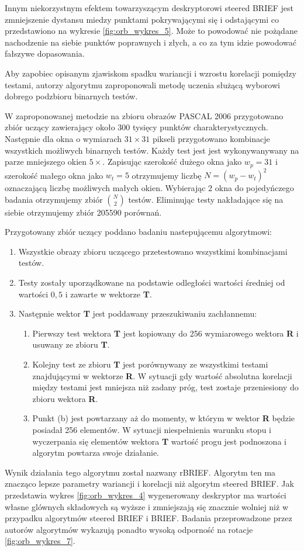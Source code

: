 Innym niekorzystnym efektem towarzyszącym deskryptorowi steered BRIEF jest zmniejszenie dystansu miedzy punktami pokrywającymi się i odstającymi co przedstawiono na wykresie \ref{fig:orb_wykres_5}. Może to powodować nie pożądane nachodzenie na siebie punktów poprawnych i złych, a co za tym idzie powodować fałszywe dopasowania.

Aby zapobiec opisanym zjawiskom spadku wariancji i wzrostu korelacji pomiędzy testami, autorzy algorytmu zaproponowali metodę uczenia służącą wyborowi dobrego podzbioru binarnych testów.

W zaproponowanej metodzie na zbioru obrazów PASCAL 2006 \cite{pascal} przygotowano zbiór uczący zawierający około 300 tysięcy punktów charakterystycznych. Następnie dla okna o wymiarach $31\times31$ pikseli przygotowano kombinacje wszystkich możliwych binarnych testów. Każdy test jest jest wykonywanywany na parze mniejszego okien $5\times$. Zapisując szerokość dużego okna jako $w_p = 31$ i szerokość małego okna jako $w_t = 5$ otrzymujemy liczbę $N = (w_p - w_t)^2$ oznaczającą liczbę możliwych małych okien. Wybierając 2 okna do pojedyńczego badania otrzymujemy zbiór ${N\choose 2}$ testów. Eliminując testy nakładające się na siebie otrzymujemy zbiór 205590 porównań.

Przygotowany zbiór uczący poddano badaniu nastepującemu algorytmowi:
\begin{enumerate}
\item Wszystkie obrazy zbioru uczącego przetestowano wszystkimi kombinacjami testów.
\item Testy zostały uporządkowane na podstawie odległości wartości średniej od wartości $0,5$ i zawarte w wektorze \textbf{T}.
\item Następnie wektor \textbf{T} jest poddawany przeszukiwaniu zachłannemu:
\begin{enumerate}
\item Pierwszy test wektora \textbf{T} jest kopiowany do 256 wymiarowego wektora \textbf{R} i usuwany ze zbioru \textbf{T}.
\item Kolejny test ze zbioru \textbf{T} jest porównywany ze wszystkimi testami znajdującymi w wektorze \textbf{R}. W sytuacji gdy wartość absolutna korelacji między testami jest mniejsza niż zadany próg, test zostaje przeniesiony do zbioru wektora \textbf{R}.
\item Punkt (b) jest powtarzany aż do momenty, w którym w wektor \textbf{R} będzie posiadał 256 elementów. W sytuacji niespełnienia warunku stopu i wyczerpania się elementów wektora \textbf{T} wartość progu jest podnoszona i algorytm powtarza swoje działanie.
\end{enumerate}
\end{enumerate}
Wynik działania tego algorytmu został nazwany rBRIEF. Algorytm ten ma znacząco lepsze parametry wariancji i korelacji niż algorytm steered BRIEF. Jak przedstawia wykres \ref{fig:orb_wykres_4} wygenerowany deskryptor ma wartości własne glównych składowych są wyższe i zmniejszają się znacznie wolniej niż w przypadku algorytmów steered BRIEF i BRIEF. Badania przeprowadzone przez autorów algorytmów wykazują ponadto wysoką odporność na rotacje \ref{fig:orb_wykres_7}.